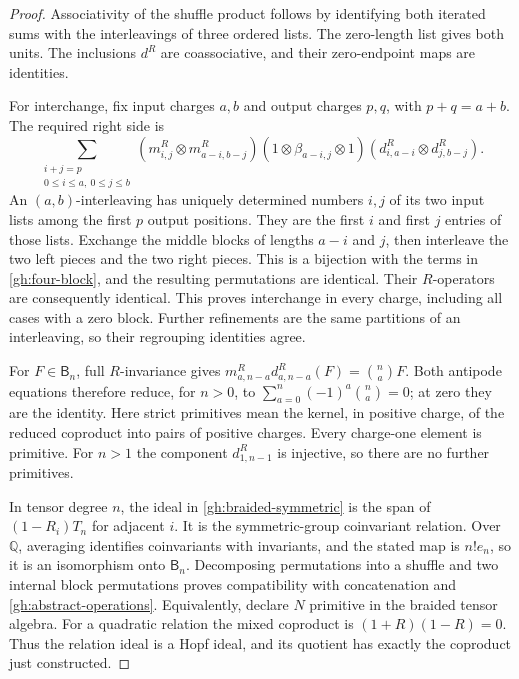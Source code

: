 \begin{proof}
Associativity of the shuffle product follows by identifying both
iterated sums with the interleavings of three ordered lists.
The zero-length list gives both units. The inclusions $d^R$ are
coassociative, and their zero-endpoint maps are identities.

For interchange, fix input charges $a,b$ and output charges
$p,q$, with $p+q=a+b$. The required right side is
\begin{equation}\label{gh:four-block}
 \sum_{\substack{i+j=p\\0\leq i\leq a,\ 0\leq j\leq b}}
 (m^R_{i,j}\otimes m^R_{a-i,b-j})
 (1\otimes\beta_{a-i,j}\otimes1)
 (d^R_{i,a-i}\otimes d^R_{j,b-j}).
\end{equation}
An $(a,b)$-interleaving has uniquely determined numbers $i,j$ of
its two input lists among the first $p$ output positions.
They are the first $i$ and first $j$ entries of those lists.
Exchange the middle blocks of lengths $a-i$ and $j$, then
interleave the two left pieces and the two right pieces.
This is a bijection with the terms in \eqref{gh:four-block}, and
the resulting permutations are identical. Their $R$-operators
are consequently identical. This proves interchange in every
charge, including all cases with a zero block.
Further refinements are the same partitions of an interleaving,
so their regrouping identities agree.

For $F\in\mathsf B_n$, full $R$-invariance gives
$m^R_{a,n-a}d^R_{a,n-a}(F)=\binom naF$.
Both antipode equations therefore reduce, for $n>0$, to
$\sum_{a=0}^n(-1)^a\binom na=0$; at zero they are the identity.
Here strict primitives mean the kernel, in positive charge, of
the reduced coproduct into pairs of positive charges.
Every charge-one element is primitive. For $n>1$ the component
$d^R_{1,n-1}$ is injective, so there are no further primitives.

In tensor degree $n$, the ideal in
\eqref{gh:braided-symmetric} is the span of
$(1-R_i)T_n$ for adjacent $i$.
It is the symmetric-group coinvariant relation. Over $\mathbb Q$,
averaging identifies coinvariants with invariants, and the stated
map is $n!e_n$, so it is an isomorphism onto $\mathsf B_n$.
Decomposing permutations into a shuffle and two internal block
permutations proves compatibility with concatenation and
\eqref{gh:abstract-operations}.
Equivalently, declare $N$ primitive in the braided tensor algebra.
For a quadratic relation the mixed coproduct is
$(1+R)(1-R)=0$. Thus the relation ideal is a Hopf ideal, and its
quotient has exactly the coproduct just constructed.
\end{proof}

